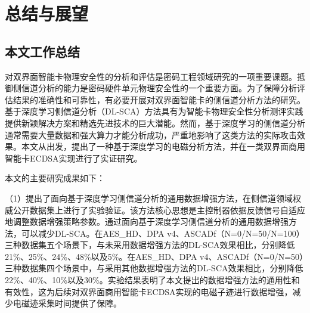 \chapter{总结与展望}\label{chap:conclusion}{
	\section{本文工作总结}
	对双界面智能卡物理安全性的分析和评估是密码工程领域研究的一项重要课题。抵御侧信道分析的能力是密码硬件单元物理安全性的一个重要方面。为了保障分析评估结果的准确性和可靠性，有必要开展对双界面智能卡的侧信道分析方法的研究。基于深度学习侧信道分析（DL-SCA）方法具有为智能卡物理安全性分析测评实践提供新颖解决方案和精选先进技术的巨大潜能。然而，基于深度学习的侧信道分析通常需要大量数据和强大算力才能分析成功，严重地影响了这类方法的实际攻击效果。本文从\jiaodu 出发，提出了一种基于深度学习的电磁分析方法，并在一类双界面商用智能卡ECDSA实现进行了实证研究。
	
	本文的主要研究成果如下：
	
	（1）提出了面向基于深度学习侧信道分析的通用数据增强方法，在侧信道领域权威公开数据集上进行了实验验证。该方法核心思想是主控制器依据反馈信号自适应地调整数据增强策略参数。通过面向基于深度学习侧信道分析的通用数据增强方法，可以减少DL-SCA\chenggongtiaoshu。在AES\_HD、DPA v4、ASCADf（N=0/N=50/N=100）三种数据集五个场景下，与未采用数据增强方法的DL-SCA效果相比，\chenggongtiaoshu 分别降低21\%、25\%、24\%、48\%以及5\%。在AES\_HD、DPA v4、ASCADf（N=0/N=50）三种数据集四个场景中，与采用其他数据增强方法的DL-SCA效果相比，\chenggongtiaoshu 分别降低22\%、40\%、10\%以及30\%。实验结果表明了本文提出的数据增强方法的通用性和有效性，这为后续对双界面商用智能卡ECDSA实现的电磁子迹进行数据增强，减少电磁迹采集时间提供了保障。
	
}
